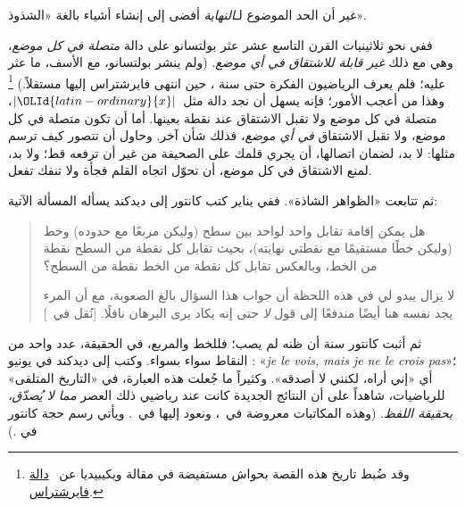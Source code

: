 \documentclass[../../../include/open-logic-section]{subfiles}
\begin{document}

غير أن الحد الموضوع لـ\emph{النهاية} أفضى إلى إنشاء أشياء بالغة «الشذوذ».

ففي نحو ثلاثينيات القرن التاسع عشر عثر بولتسانو على دالة \emph{متصلة في
كل موضع}، وهي مع ذلك \emph{غير قابلة للاشتقاق في أي موضع}. (ولم ينشر
بولتسانو، مع الأسف، ما عثر عليه؛ فلم يعرف الرياضيون الفكرة حتى سنة ،
حين انتهى فايرشتراس إليها مستقلاً.) \footnote{وقد ضُبط تاريخ هذه القصة
بحواش مستفيضة في مقالة ويكيبيديا عن
~\href{http://en.wikipedia.org/wiki/Weierstrass_function}{دالة
فايرشتراس}.} وهذا من أعجب الأمور؛ فإنه يسهل أن نجد دالة مثل~$|\OLId{latin-ordinary}{x}|$، متصلة
في كل موضع ولا تقبل الاشتقاق عند نقطة بعينها. أما أن تكون متصلة في كل
موضع، ولا تقبل الاشتقاق \emph{في أي موضع}، فذلك شأن آخر. وحاول أن تتصور
كيف ترسم مثلها: لا بد، لضمان اتصالها، أن يجري قلمك على الصحيفة من غير أن
ترفعه قط؛ ولا بد، لمنع الاشتقاق في كل موضع، أن تحوّل اتجاه القلم فجأة ولا
تنفك تفعل.

ثم تتابعت «الظواهر الشاذة». ففي  يناير  كتب كانتور إلى ديدكند يسأله
المسألة الآتية:
\begin{quote}
هل يمكن إقامة تقابل واحد لواحد بين سطح (وليكن مربعًا مع حدوده) وخط
(وليكن خطًا مستقيمًا مع نقطتي نهايته)، بحيث تقابل كل نقطة من السطح
نقطة من الخط، وبالعكس تقابل كل نقطة من الخط نقطة من السطح؟

لا يزال يبدو لي في هذه اللحظة أن جواب هذا السؤال بالغ الصعوبة، مع أن
المرء يجد نفسه هنا أيضًا مندفعًا إلى قول \emph{لا} حتى إنه يكاد يرى
البرهان نافلًا.
[نُقل في~\citealt{Gouvea2011}]
\end{quote}
ثم أثبت كانتور سنة  أن ظنه لم يصب؛ فللخط والمربع، في الحقيقة، عدد
واحد من النقاط سواء بسواء. وكتب إلى ديدكند في  يونيو :
«\emph{je le vois, mais je ne le crois pas}»؛ أي «إني أراه، لكنني لا
أصدقه». وكثيراً ما جُعلت هذه العبارة، في «التاريخ المتلقى» للرياضيات،
شاهداً على أن النتائج الجديدة كانت عند رياضيي ذلك العصر \emph{مما لا
يُصدّق، بحقيقة اللفظ}. (وهذه المكاتبات معروضة في~\citet{Gouvea2011}،
ونعود إليها في~. ويأتي رسم حجة كانتور في
.)
\end{document}

